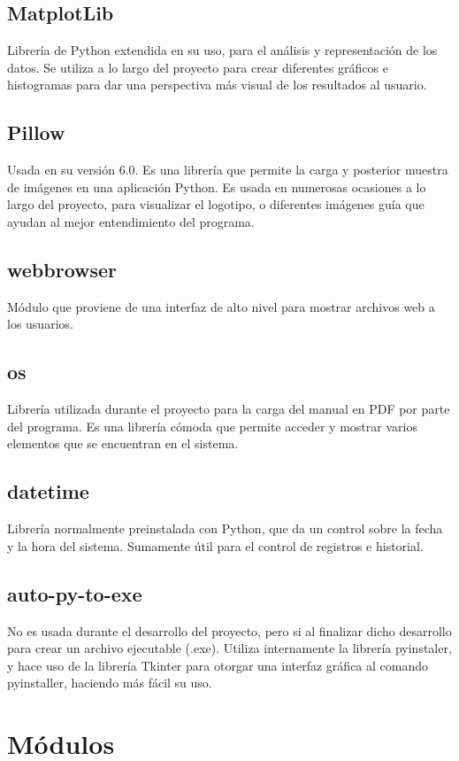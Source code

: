 \subsection{MatplotLib}
Librería de Python extendida en su uso, para el análisis y representación de los datos. Se utiliza a lo largo del proyecto para crear diferentes gráficos e histogramas para dar una perspectiva más visual de los resultados al usuario.
\subsection{Pillow}
Usada en su versión 6.0. Es una librería que permite la carga y posterior muestra de imágenes en una aplicación Python. Es usada en numerosas ocasiones a lo largo del proyecto, para visualizar el logotipo, o diferentes imágenes guía que ayudan al mejor entendimiento del programa.
\subsection{webbrowser}
Módulo que proviene de una interfaz de alto nivel para mostrar archivos web a los usuarios.
\subsection{os}
Librería utilizada durante el proyecto para la carga del manual en PDF por parte del programa. Es una librería cómoda que permite acceder y mostrar varios elementos que se encuentran en el sistema.
\subsection{datetime}
Librería normalmente preinstalada con Python, que da un control sobre la fecha y la hora del sistema. Sumamente útil para el control de registros  e historial.

\subsection{auto-py-to-exe}
No es usada durante el desarrollo del proyecto, pero si al finalizar dicho desarrollo para crear un archivo ejecutable (.exe). Utiliza internamente la librería pyinstaler, y hace uso de la librería Tkinter para otorgar una interfaz gráfica al comando pyinstaller, haciendo más fácil su uso.

\section{Módulos}
